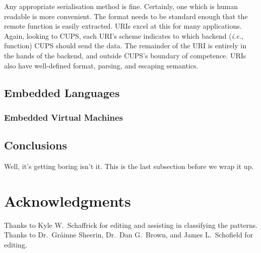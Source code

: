 \documentclass[letterpaper,twocolumn,10pt]{article}
\begin{document}
Any appropriate serialisation method is fine. Certainly, one which is human readable is more convenient. The format needs to be standard enough that the remote function is easily extracted. URIs excel at this for many applications. Again, looking to CUPS, each URI's scheme indicates to which backend (\emph{i.e.}, function) CUPS should send the data. The remainder of the URI is entirely in the hands of the backend, and outside CUPS's boundary of competence. URIs also have well-defined format, parsing, and escaping semantics.

\subsection{Embedded Languages}
\subsubsection{Embedded Virtual Machines}

\subsection{Conclusions}

Well, it's getting boring isn't it.  This is the last subsection
before we wrap it up.

\section{Acknowledgments}
Thanks to Kyle W.~Schaffrick for editing and assisting in classifying the patterns. Thanks to Dr.~Gr\'ainne Sheerin, Dr.~Dan G.~Brown, and James L.~Schofield for editing.

{\footnotesize 
}

\theendnotes
\end{document}
